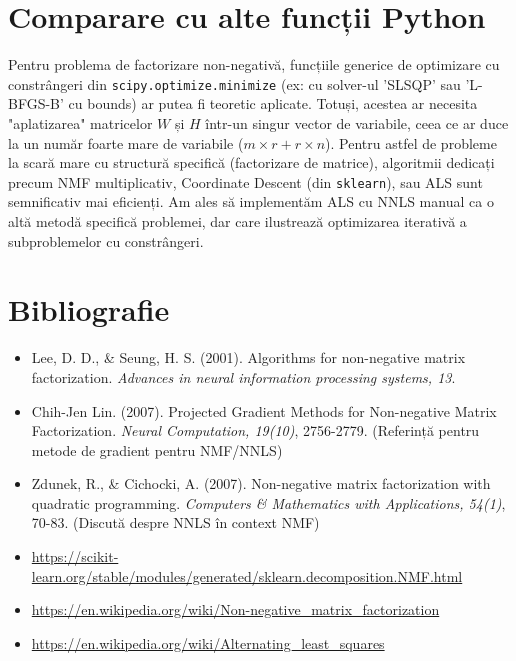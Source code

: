 \documentclass[12pt,a4paper]{article}
\begin{document}
\section{Comparare cu alte funcții Python}
Pentru problema de factorizare non-negativă, funcțiile generice de optimizare cu constrângeri din \texttt{scipy.optimize.minimize} (ex: cu solver-ul 'SLSQP' sau 'L-BFGS-B' cu bounds) ar putea fi teoretic aplicate. Totuși, acestea ar necesita "aplatizarea" matricelor $W$ și $H$ într-un singur vector de variabile, ceea ce ar duce la un număr foarte mare de variabile ($m \times r + r \times n$). Pentru astfel de probleme la scară mare cu structură specifică (factorizare de matrice), algoritmii dedicați precum NMF multiplicativ, Coordinate Descent (din \texttt{sklearn}), sau ALS sunt semnificativ mai eficienți. Am ales să implementăm ALS cu NNLS manual ca o altă metodă specifică problemei, dar care ilustrează optimizarea iterativă a subproblemelor cu constrângeri.

\section{Bibliografie}
\begin{itemize}
\item Lee, D. D., \& Seung, H. S. (2001). Algorithms for non-negative matrix factorization. \textit{Advances in neural information processing systems, 13}.
\item Chih-Jen Lin. (2007). Projected Gradient Methods for Non-negative Matrix Factorization. \textit{Neural Computation, 19(10)}, 2756-2779. (Referință pentru metode de gradient pentru NMF/NNLS)
\item Zdunek, R., \& Cichocki, A. (2007). Non-negative matrix factorization with quadratic programming. \textit{Computers \& Mathematics with Applications, 54(1)}, 70-83. (Discută despre NNLS în context NMF)
\item \url{https://scikit-learn.org/stable/modules/generated/sklearn.decomposition.NMF.html}
\item \url{https://en.wikipedia.org/wiki/Non-negative_matrix_factorization}
\item \url{https://en.wikipedia.org/wiki/Alternating_least_squares}
\end{itemize}
\end{document}
